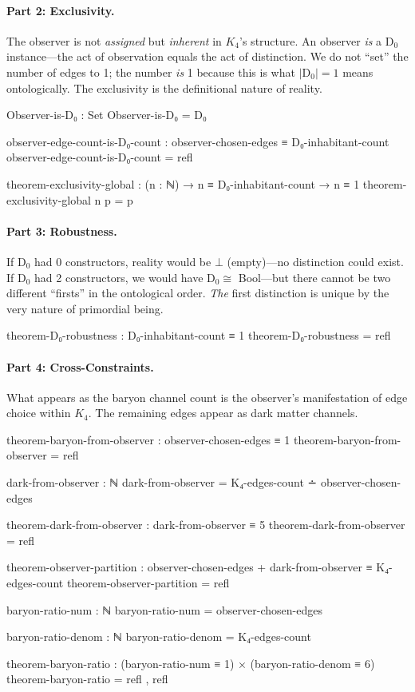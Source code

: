 \documentclass[11pt,a4paper]{book}
\begin{document}
\paragraph{Part 2: Exclusivity.}
The observer is not \emph{assigned} but \emph{inherent} in $K_4$'s structure. An observer \emph{is} a D$_0$ instance—the act of observation equals the act of distinction. We do not ``set'' the number of edges to 1; the number \emph{is} 1 because this is what $|$D$_0| = 1$ means ontologically. The exclusivity is the definitional nature of reality.

\begin{code}
Observer-is-D₀ : Set
Observer-is-D₀ = D₀

observer-edge-count-is-D₀-count : observer-chosen-edges ≡ D₀-inhabitant-count
observer-edge-count-is-D₀-count = refl

theorem-exclusivity-global : (n : ℕ) → n ≡ D₀-inhabitant-count → n ≡ 1
theorem-exclusivity-global n p = p
\end{code}

\paragraph{Part 3: Robustness.}
If D$_0$ had 0 constructors, reality would be $\bot$ (empty)—no distinction could exist. If D$_0$ had 2 constructors, we would have D$_0 \cong$ Bool—but there cannot be two different ``firsts'' in the ontological order. \emph{The} first distinction is unique by the very nature of primordial being.

\begin{code}
theorem-D₀-robustness : D₀-inhabitant-count ≡ 1
theorem-D₀-robustness = refl
\end{code}

\paragraph{Part 4: Cross-Constraints.}
What appears as the baryon channel count is the observer's manifestation of edge choice within $K_4$. The remaining edges appear as dark matter channels.

\begin{code}
theorem-baryon-from-observer : observer-chosen-edges ≡ 1
theorem-baryon-from-observer = refl

dark-from-observer : ℕ
dark-from-observer = K₄-edges-count ∸ observer-chosen-edges

theorem-dark-from-observer : dark-from-observer ≡ 5
theorem-dark-from-observer = refl

theorem-observer-partition : observer-chosen-edges + dark-from-observer ≡ K₄-edges-count
theorem-observer-partition = refl

baryon-ratio-num : ℕ
baryon-ratio-num = observer-chosen-edges

baryon-ratio-denom : ℕ
baryon-ratio-denom = K₄-edges-count

theorem-baryon-ratio : (baryon-ratio-num ≡ 1) × (baryon-ratio-denom ≡ 6)
theorem-baryon-ratio = refl , refl
\end{code}
\end{document}
